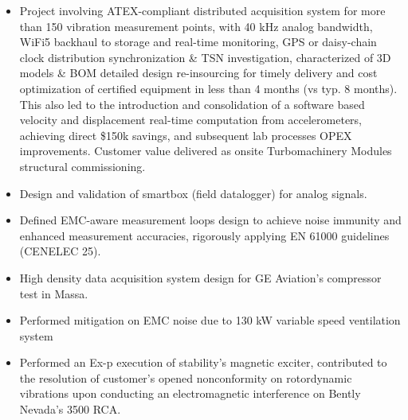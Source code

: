 \documentclass[9pt,a4paper,ragged2e,withhyper]{altacv} %
\begin{document}
\begin{paracol}{2}
\begin{itemize}
\item Project involving ATEX-compliant distributed acquisition system for more than 150 vibration measurement points, 
with 40 kHz analog bandwidth, WiFi5 backhaul to storage and real-time monitoring, 
GPS or daisy-chain clock distribution synchronization \& TSN investigation, 
characterized of 3D models \& BOM detailed design re-insourcing for timely delivery and cost optimization of 
certified equipment in less than 4 months (vs typ. 8 months). 
This also led to the introduction and consolidation of a software based velocity and displacement 
real-time computation from accelerometers, achieving direct \$150k savings, and subsequent lab processes OPEX improvements. 
Customer value delivered as onsite Turbomachinery Modules structural commissioning.
\end{itemize}
\divider

\begin{itemize}
\item Design and validation of smartbox (field datalogger) for analog signals. 
\item Defined EMC-aware measurement loops design to achieve noise immunity and enhanced measurement accuracies, 
rigorously applying EN 61000 guidelines (CENELEC 25).
\end{itemize}
\divider

\begin{itemize}
\item High density data acquisition system design for GE Aviation’s compressor test in Massa. 
\item Performed mitigation on EMC noise due to 130 kW variable speed ventilation system
\end{itemize}
\divider

\begin{itemize}
\item Performed an Ex-p execution of stability’s magnetic exciter, contributed to the
resolution of customer’s opened nonconformity on rotordynamic vibrations upon
conducting an electromagnetic interference on Bently Nevada's 3500 RCA.
\end{itemize}
\divider


\end{paracol}
\end{document}
